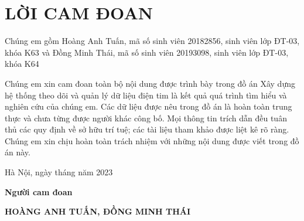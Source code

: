 \section*{LỜI CAM ĐOAN} %
\thispagestyle{empty}

Chúng em gồm Hoàng Anh Tuấn, mã số sinh viên 20182856, sinh viên lớp ĐT-03, khóa K63 và Đồng Minh Thái, mã số sinh viên 20193098, sinh viên lớp ĐT-03, khóa K64

Chúng em xin cam đoan toàn bộ nội dung được trình bày trong đồ án Xây dựng hệ thống theo dõi và quản lý dữ liệu điện tim là kết quả quá trình tìm hiểu và
nghiên cứu của chúng em. Các dữ liệu được nêu trong đồ án là hoàn toàn trung thực
và chưa từng được người khác công bố. Mọi thông tin trích dẫn đều tuân thủ các quy
định về sở hữu trí tuệ; các tài liệu tham khảo được liệt kê rõ ràng. Chúng em xin
chịu hoàn toàn trách nhiệm với những nội dung được viết trong đồ án này.


\vspace{6pt}

\hspace{8cm}Hà Nội, ngày  tháng   năm 2023

\hspace{9cm}\textbf{Người cam đoan}

\vspace{1cm}
\hspace{7cm}\textbf{HOÀNG ANH TUẤN, ĐỒNG MINH THÁI}

\cleardoublepage